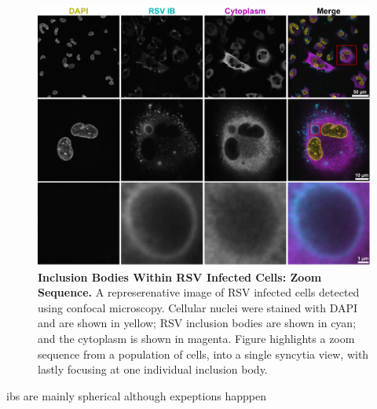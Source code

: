 \begin{figure}
    \centering
    \includegraphics[width=1\linewidth]{08. Chapter 3/Figs/01. Localisation introduction/01. IB-zooms.pdf}
    \caption[Inclusion Bodies Within RSV Infected Cells: Zoom Sequence.]{\textbf{Inclusion Bodies Within RSV Infected Cells: Zoom Sequence.} A represerenative image of RSV infected cells detected using confocal microscopy. Cellular nuclei were stained with DAPI and are shown in yellow; RSV inclusion bodies are shown in cyan; and the cytoplasm is shown in magenta. Figure highlights a zoom sequence from a population of cells, into a single syncytia view, with lastly focusing at one individual inclusion body.}
    \label{fig:Inclusion Bodies Within RSV Infected Cells: Zoom Sequence}
\end{figure}

ibs are mainly spherical although expeptions happpen

